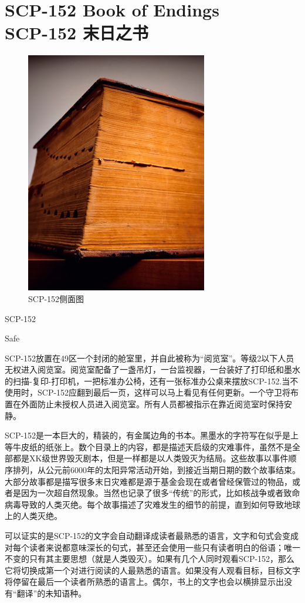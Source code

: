 \chapter[SCP-152 末日之书]{
    SCP-152 Book of Endings\\
    SCP-152 末日之书
}

\label{chap:SCP-152}

\begin{figure}[H]
    \centering
    \includegraphics[width=0.5\linewidth]{images/SCP-152.jpg}
    \caption*{SCP-152侧面图}
\end{figure}

SCP-152

Safe

SCP-152放置在49区一个封闭的舱室里，并自此被称为“阅览室”。等级2以下人员无权进入阅览室。阅览室配备了一盏吊灯，一台监视器，一台装好了打印纸和墨水的扫描-复印-打印机，一把标准办公椅，还有一张标准办公桌来摆放SCP-152.当不使用时，SCP-152应翻到最后一页，这样可以马上看见有任何更新。一个守卫将布置在外面防止未授权人员进入阅览室。所有人员都被指示在靠近阅览室时保持安静。

SCP-152是一本巨大的，精装的，有金属边角的书本。黑墨水的字符写在似乎是上等牛皮纸的纸张上。数个目录上的内容，都是描述天启级的灾难事件，虽然不是全部都是XK级世界毁灭剧本，但是一样都是以人类毁灭为结局。这些故事以事件顺序排列，从公元前6000年的太阳异常活动开始，到接近当期日期的数个故事结束。大部分故事都是描写很多末日灾难都是源于基金会现在或者曾经保管过的物品，或者是因为一次超自然现象。当然也记录了很多“传统”的形式，比如核战争或者致命病毒导致的人类灭绝。每个故事描述了灾难发生的细节的前提，直到如何导致地球上的人类灭绝。

可以证实的是SCP-152的文字会自动翻译成读者最熟悉的语言，文字和句式会变成对每个读者来说都意味深长的句式，甚至还会使用一些只有读者明白的俗语；唯一不变的只有其主要思想（就是人类毁灭）。如果有几个人同时观看SCP-152，那么它将切换成第一个对进行阅读的人最熟悉的语言。如果没有人观看目标，目标文字将停留在最后一个读者所熟悉的语言上。偶尔，书上的文字也会以横排显示出没有“翻译”的未知语种。

